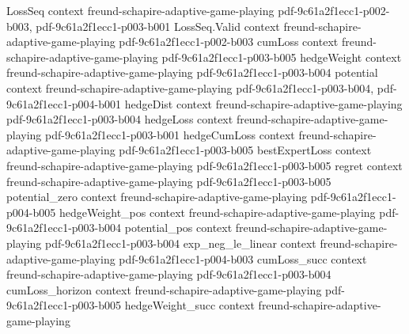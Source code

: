 \begin{lemma}
\label{hedge_construction}
\leanok
{}
\proofstep
  {LossSeq}
  {context}
  {freund-schapire-adaptive-game-playing}
  {pdf-9c61a2f1ecc1-p002-b003,
    pdf-9c61a2f1ecc1-p003-b001}
\proofstep
  {LossSeq.Valid}
  {context}
  {freund-schapire-adaptive-game-playing}
  {pdf-9c61a2f1ecc1-p002-b003}
\proofstep
  {cumLoss}
  {context}
  {freund-schapire-adaptive-game-playing}
  {pdf-9c61a2f1ecc1-p003-b005}
\proofstep
  {hedgeWeight}
  {context}
  {freund-schapire-adaptive-game-playing}
  {pdf-9c61a2f1ecc1-p003-b004}
\proofstep
  {potential}
  {context}
  {freund-schapire-adaptive-game-playing}
  {pdf-9c61a2f1ecc1-p003-b004,
    pdf-9c61a2f1ecc1-p004-b001}
\proofstep
  {hedgeDist}
  {context}
  {freund-schapire-adaptive-game-playing}
  {pdf-9c61a2f1ecc1-p003-b004}
\proofstep
  {hedgeLoss}
  {context}
  {freund-schapire-adaptive-game-playing}
  {pdf-9c61a2f1ecc1-p003-b001}
\proofstep
  {hedgeCumLoss}
  {context}
  {freund-schapire-adaptive-game-playing}
  {pdf-9c61a2f1ecc1-p003-b005}
\proofstep
  {bestExpertLoss}
  {context}
  {freund-schapire-adaptive-game-playing}
  {pdf-9c61a2f1ecc1-p003-b005}
\proofstep
  {regret}
  {context}
  {freund-schapire-adaptive-game-playing}
  {pdf-9c61a2f1ecc1-p003-b005}
\proofstep
  {potential_zero}
  {context}
  {freund-schapire-adaptive-game-playing}
  {pdf-9c61a2f1ecc1-p004-b005}
\proofstep
  {hedgeWeight_pos}
  {context}
  {freund-schapire-adaptive-game-playing}
  {pdf-9c61a2f1ecc1-p003-b004}
\proofstep
  {potential_pos}
  {context}
  {freund-schapire-adaptive-game-playing}
  {pdf-9c61a2f1ecc1-p003-b004}
\proofstep
  {exp_neg_le_linear}
  {context}
  {freund-schapire-adaptive-game-playing}
  {pdf-9c61a2f1ecc1-p004-b003}
\proofstep
  {cumLoss_succ}
  {context}
  {freund-schapire-adaptive-game-playing}
  {pdf-9c61a2f1ecc1-p003-b004}
\proofstep
  {cumLoss_horizon}
  {context}
  {freund-schapire-adaptive-game-playing}
  {pdf-9c61a2f1ecc1-p003-b005}
\proofstep
  {hedgeWeight_succ}
  {context}
  {freund-schapire-adaptive-game-playing}

\end{lemma}
